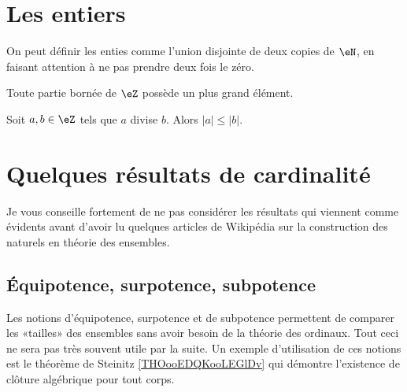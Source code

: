 \section{Les entiers}


On peut définir les enties comme l'union disjointe de deux copies de \( \eN\), en faisant attention à ne pas prendre deux fois le zéro.

\begin{lemma}       \label{LEMooMYEIooNFwNVI}
    Toute partie bornée de \( \eZ\) possède un plus grand élément.
\end{lemma}

\begin{proposition}     \label{PROPooYJBMooZrzkNX}
    Soit \( a,b\in \eZ\) tels que \( a\) divise \( b\). Alors \( | a |\leq | b |\).
\end{proposition}



\section{Quelques résultats de cardinalité}

Je vous conseille fortement de ne pas considérer les résultats qui viennent comme évidents avant d'avoir lu quelques articles de Wikipédia sur la construction des naturels en théorie des ensembles.

\subsection{Équipotence, surpotence, subpotence}

Les notions d'équipotence, surpotence et de subpotence permettent de comparer les «tailles» des ensembles sans avoir besoin de la théorie des ordinaux. Tout ceci ne sera pas très souvent utile par la suite. Un exemple d'utilisation de ces notions est le théorème de Steinitz \ref{THOooEDQKooLEGlDv} qui démontre l'existence de clôture algébrique pour tout corps.

